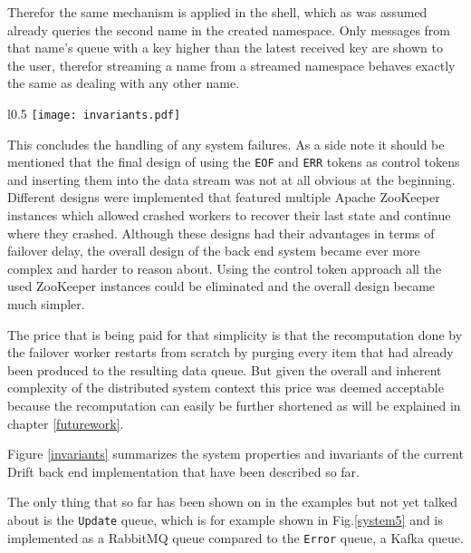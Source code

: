 Therefor the same mechanism is applied in the shell, which as was
assumed already queries the second name in the created namespace.
Only messages from that name's queue with a key higher than the
latest received key are shown to the user, therefor streaming a name
from a streamed namespace behaves exactly the same as dealing with
any other name.

\begin{wrapfigure}{l}{0.5\textwidth}
  \texttt{[image: invariants.pdf]}
  \caption{Table summarizing the properties and invariants of
           the Drift system implementation.}
  \label{invariants}
\end{wrapfigure}

This concludes the handling of any system failures. As a side note
it should be mentioned that the final design of using the
\texttt{EOF} and \texttt{ERR} tokens as control tokens and inserting
them into the data stream was not at all obvious at the beginning.
Different designs were implemented that featured multiple Apache
ZooKeeper instances which allowed crashed workers to recover their
last state and continue where they crashed. Although these designs had
their advantages in terms of failover delay, the overall design
of the back end system became ever more complex and harder to
reason about. Using the control token approach all the used
ZooKeeper instances could be eliminated and the overall design
became much simpler.

The price that is being paid for that simplicity is that the
recomputation done by the failover worker restarts from scratch
by purging every item that had already been produced to the
resulting data queue. But given the overall and inherent complexity
of the distributed system context this price was deemed acceptable
because the recomputation can easily be further shortened as will
be explained in chapter \ref{futurework}.

Figure \ref{invariants} summarizes the system properties and
invariants of the current Drift back end implementation
that have been described so far.
\newline

The only thing that so far has been shown on in the examples
but not yet talked about is the \texttt{Update} queue, which
is for example shown in Fig.\ref{system5} and is implemented
as a RabbitMQ queue compared to the \texttt{Error} queue, a
Kafka queue.

